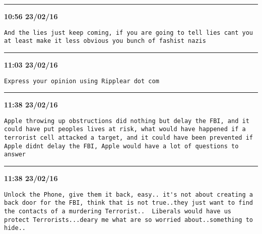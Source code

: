 \hrule%

\begin{adjustwidth}{0cm}{0cm}
\footnotesize \textbf{10:56 23/02/16}

\begin{lstlisting}[breaklines, breakatwhitespace, basicstyle=\small, frame=leftline]
And the lies just keep coming, if you are going to tell lies cant you at least make it less obvious you bunch of fashist nazis
\end{lstlisting}
\end{adjustwidth}

\hrule%

\begin{adjustwidth}{0cm}{0cm}
\footnotesize \textbf{11:03 23/02/16}

\begin{lstlisting}[breaklines, breakatwhitespace, basicstyle=\small, frame=leftline]
Express your opinion using Ripplear dot com
\end{lstlisting}
\end{adjustwidth}

\hrule%

\begin{adjustwidth}{0cm}{0cm}
\footnotesize \textbf{11:38 23/02/16}

\begin{lstlisting}[breaklines, breakatwhitespace, basicstyle=\small, frame=leftline]
Apple throwing up obstructions did nothing but delay the FBI, and it could have put peoples lives at risk, what would have happened if a terrorist cell attacked a target, and it could have been prevented if Apple didnt delay the FBI, Apple would have a lot of questions to answer
\end{lstlisting}
\end{adjustwidth}

\hrule%

\begin{adjustwidth}{0cm}{0cm}
\footnotesize \textbf{11:38 23/02/16}

\begin{lstlisting}[breaklines, breakatwhitespace, basicstyle=\small, frame=leftline]
Unlock the Phone, give them it back, easy.. it's not about creating a back door for the FBI, think that is not true..they just want to find the contacts of a murdering Terrorist..  Liberals would have us protect Terrorists...deary me what are so worried about..something to hide..
\end{lstlisting}
\end{adjustwidth}

